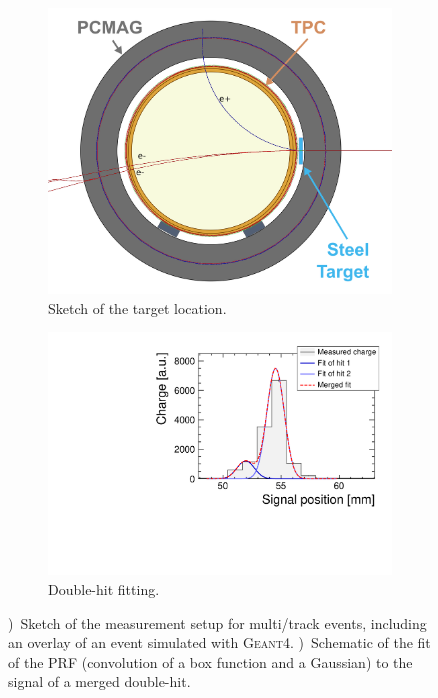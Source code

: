 \begin{figure}
\begin{subfigure}[b]{0.46\textwidth}
\includegraphics[width=\textwidth]{Tracker/TPC_Bonn/plots/TPC-DG_steel-target_principle_geant4.png}
\caption{Sketch of the target location.}
\label{sfig:target_principle_simu}
\end{subfigure}%
\begin{subfigure}[b]{0.54\textwidth}
\includegraphics[width=\textwidth]{Tracker/TPC_Bonn/plots/TPC-DG_DoubleHitSplittingPrinciple.pdf}
\caption{Double-hit fitting.}
\label{sfig:mergedhit}
\end{subfigure}
\caption{\protect{})~Sketch of the measurement setup for multi\-/track events, including an overlay of an event simulated with \textsc{Geant4}. \protect{})~Schematic of the fit of the PRF (convolution of a box function and a Gaussian) to the signal of a merged double-hit.}
\label{fig:doublehitseparationprinciple}
\end{figure}

